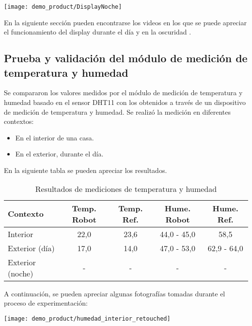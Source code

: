 \begin{center}
\texttt{[image: demo\_product/DisplayNoche]}
  \label{fig:DisplayNoche}
\end{center}


En la siguiente sección pueden encontrarse los videos en los que se puede apreciar el funcionamiento del display durante el día \cite{Demo_Mediciones} y en la oscuridad \cite{Demo_Display_Oscuridad}.

\subsection{Prueba y validación del módulo de medición de temperatura y humedad}

Se compararon los valores medidos por el módulo de medición de temperatura y humedad basado en el sensor DHT11 con los obtenidos a través de un dispositivo de medición de temperatura y humedad. Se realizó la medición en diferentes contextos:

\begin{itemize}
	\item En el interior de una casa.
	\item En el exterior, durante el día.
\end{itemize}

En la siguiente tabla se pueden apreciar los resultados.

\begin{table}[h]
\centering
\caption[Resultados de mediciones de temperatura y humedad]{Resultados de mediciones de temperatura y humedad}
\begin{tabular}{l c c c c}
\toprule
\textbf{Contexto} & \textbf{Temp. Robot} & \textbf{Temp. Ref.} & \textbf{Hume. Robot}  & \textbf{Hume. Ref.}\\
\midrule
Interior & 22,0 & 23,6 & 44,0 - 45,0 & 58,5 \\
Exterior (día) & 17,0  & 14,0 & 47,0 - 53,0 & 62,9 - 64,0 \\
Exterior (noche) & - & - & - & - \\
\bottomrule
\hline
\end{tabular}
\end{table}

A continuación, se pueden apreciar algunas fotografías tomadas durante el proceso de experimentación:

\begin{center}
\texttt{[image: demo\_product/humedad\_interior\_retouched]}
  \label{fig:humedad_interior_retouched}
\end{center}


